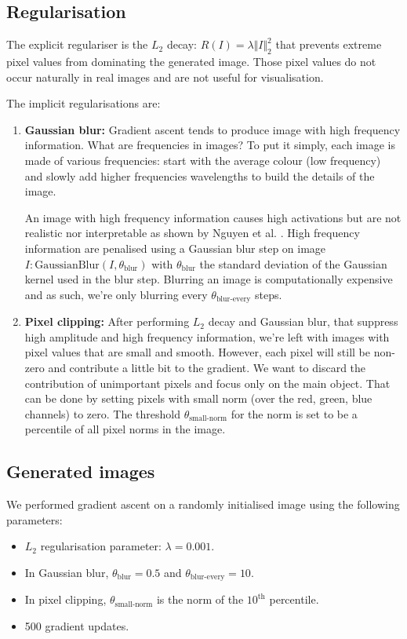 \subsection{Regularisation}

The explicit regulariser is the $L_2$ decay: $R(I) = \lambda \Vert I \Vert_2^2$ that prevents extreme pixel values from dominating the generated image. Those pixel values do not occur naturally in real images and are not useful for visualisation.

The implicit regularisations are: \cite{class-vis2}
\begin{enumerate}
    \item \textbf{Gaussian blur:} Gradient ascent tends to produce image with high frequency information. What are frequencies in images? To put it simply, each image 
    is made of various frequencies: start with the average colour (low frequency) and slowly add higher frequencies wavelengths to build the details of the image.
    
    An image with high frequency information causes high activations but are not realistic nor interpretable as shown by Nguyen et al. \cite{nguyen}. High frequency 
    information are penalised using a Gaussian blur step on image $I: \text{GaussianBlur}(I, \theta_{\text{blur}})$ with $\theta_{\text{blur}}$ the standard deviation of the 
    Gaussian kernel used in the blur step. Blurring an image is computationally expensive and as such, we're only blurring every $\theta_{\text{blur-every}}$ steps.
    \item \textbf{Pixel clipping:} After performing $L_2$ decay and Gaussian blur, that suppress high amplitude and high frequency information, we're left with images 
    with pixel values that are small and smooth. However, each pixel will still be non-zero and contribute a little bit to the gradient. We want to discard the contribution of 
    unimportant pixels and focus only on the main object. That can be done by setting pixels with small norm (over the red, green, blue channels) to zero. The threshold  
    $\theta_{\text{small-norm}}$ for the norm is set to be a percentile of all pixel norms in the image.
\end{enumerate}

\subsection{Generated images}

We performed gradient ascent on a randomly initialised image using the following parameters:
\begin{itemize}
    \item $L_2$ regularisation parameter: $\lambda = 0.001$.
    \item In Gaussian blur, $\theta_{\text{blur}} = 0.5$ and $\theta_{\text{blur-every}} = 10$.
    \item In pixel clipping, $\theta_{\text{small-norm}}$ is the norm of the $10^{\text{th}}$ percentile.
    \item 500 gradient updates.
\end{itemize}


